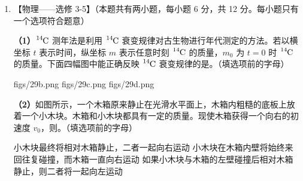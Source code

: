 \documentclass[\gkver]{gaokaozhenti}
\begin{document}
\begin{enumerate}
{figs/28b.png}
{figs/28c.png}
{figs/28d.png}

\textbf{（2）}如图所示，一定质量的理想气体密封在绝热（即与外界不发生热交换）容器中，容器内装有一可以活动的绝热活塞。今对活塞施以一竖直向下的压力 $F$，使活塞缓慢向下移动一段距离后，气体的体积减小。若忽略活塞与容器壁间的摩擦力，则被密封的气体。（填选项前的字母）


{温度降低，压强增大，内能减少}
{温度升高，压强增大，内能增加}
{温度降低，压强减小，内能增加}

\item
【物理——选修 3-5】（本题共有两小题，每小题 6 分，共 12 分。每小题只有一个选项符合题意）

\textbf{（1）}$\ce{^{14}C}$ 测年法是利用 $\ce{^{14}C}$ 衰变规律对古生物进行年代测定的方法。若以横坐标 $t$ 表示时间，纵坐标 $m$ 表示任意时刻 $\ce{^{14}C}$ 的质量，$m_{0}$ 为 $t=0$ 时 $\ce{^{14}C}$ 的质量。下面四幅图中能正确反映 $\ce{^{14}C}$ 衰变规律的是。（填选项前的字母）

{figs/29b.png}
{figs/29c.png}
{figs/29d.png}

\textbf{（2）}如图所示，一个木箱原来静止在光滑水平面上，木箱内粗糙的底板上放着一个小木块。木箱和小木块都具有一定的质量。现使木箱获得一个向右的初速度 $v_{0}$，则。（填选项前的字母）


{小木块最终将相对木箱静止，二者一起向右运动}
{小木块在木箱内壁将始终来回往复碰撞，而木箱一直向右运动}
{如果小木块与木箱的左壁碰撞后相对木箱静止，则二者将一起向左运动}

\end{enumerate}
\end{document}
